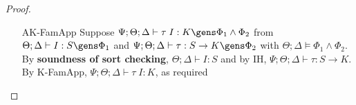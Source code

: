 \begin{proof}
\begin{itemize}
  \item[AK-FamApp] Suppose $\Psi ; \Theta ; \Delta \vdash \tau \; I : K \gens \Phi_1 \wedge \Phi_2$ from $\Theta ; \Delta \vdash I : S \gens \Phi_1$ and $ \Psi ; \Theta ; \Delta \vdash \tau : S \to K \gens \Phi_2$ with $\Theta ; \Delta \vDash \Phi_1 \wedge \Phi_2$. By \textbf{soundness of sort checking}, $\Theta ; \Delta \vdash I : S$ and by IH, $\Psi ; \Theta ; \Delta \vdash \tau : S \to K$. By K-FamApp, $\Psi ; \Theta ; \Delta \vdash \tau \; I : K$, as required
  
\end{itemize}
\end{proof}